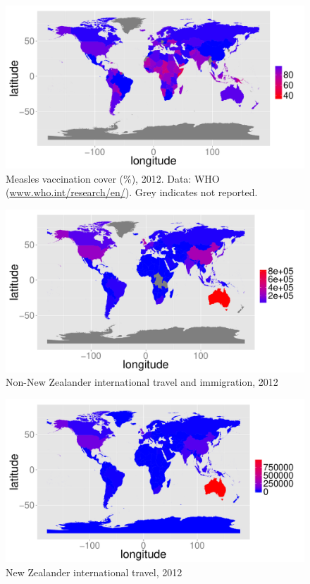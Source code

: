\documentclass{article}
\begin{document}
\begin{figure}
\begin{center}
\includegraphics{draftfinalreport_v2-048}
\end{center}
\caption{Measles vaccination cover (\%), 2012. Data: WHO (\href{http://www.who.int/research/en/}{www.who.int/research/en/}). Grey indicates not reported.}
\label{fig:cover12}
\end{figure}


\begin{figure}
\begin{center}
\includegraphics{draftfinalreport_v2-049}
\end{center}
\caption{Non-New Zealander international travel and immigration, 2012 }
\label{fig:immigration12}
\end{figure}

\begin{figure}
\begin{center}
\includegraphics{draftfinalreport_v2-050}
\end{center}
\caption{New Zealander international travel, 2012 }
\label{fig:nztravel12}
\end{figure}
\end{document}
